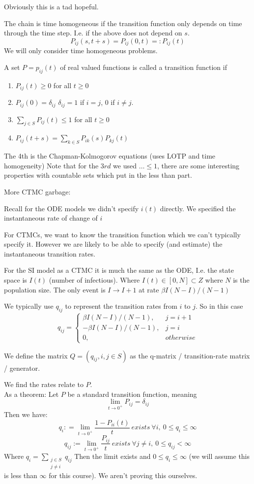 \documentclass{/home/janmebows/Documents/LatexTemplates/myassignment}
\begin{document}
Obviously this is a tad hopeful.

The chain is time homogeneous if the transition function only depends on time through the time step. I.e. if the above does not depend on $s$.
\[P_{ij}(s,t+s) = P_{ij}(0,t) =: P_{ij}(t)\]
We will only consider time homogeneous problems.

A set $P= p_{ij}(t)$ of real valued functions is called a transition function if
\begin{enumerate}
    \item $P_{ij}(t) \geq 0$ for all $t\geq 0$
    \item $P_{ij}(0) = \delta_{ij}$ $\delta_{ij} =1$ if $i=j$, $0$ if $i\neq j$.
    \item $\sum_{j\in S} P_{ij}(t) \leq 1$ for all $t\geq 0$
    \item $P_{ij}(t+s) = \sum_{k\in S} P_{ik}(s) P_{kj}(t)$
\end{enumerate}
The 4th is the Chapman-Kolmogorov equations (uses LOTP and time homogeneity)
Note that for the $3rd$ we used $\hdots \leq 1$, there are some interesting properties with countable sets which put in the less than part. 


More CTMC garbage:

Recall for the ODE models we didn't specify $i(t)$ directly. We specified the instantaneous rate of change of $i$


For CTMCs, we want to know the transition function which we can't typically specify it. However we are likely to be able to specify (and estimate) the instantaneous transition rates.

For the SI model as a CTMC it is much the same as the ODE, I.e. the state space is $I(t)$ (number of infectious). Where $I(t) \in [0,N] \subset Z$ where $N$ is the population size.
The only event is $I\to I+1$ at rate $\beta I(N-I)/(N-1)$


We typically use $q_{ij}$ to represent the transition rates from $i$ to $j$. So in this case
\[q_{ij} = \begin{cases}
\beta I(N-I)/(N-1), & j=i+1\\
-\beta I(N-I)/(N-1), & j=i\\
0, & otherwise
\end{cases}\]


We define the matrix $Q = (q_{ij}, i,j \in S)$ as the q-matrix / transition-rate matrix / generator. 

We find the rates relate to $P$. \\
As a theorem: Let $P$ be a standard transition function, meaning
\[\lim_{t\to 0^+} P_{ij} = \delta_{ij}\]
Then we have:
\[q_{i} : = \lim_{t \to 0^+} \frac{1-P_{ii}(t)}t\ exists \ \forall i,\ 0\leq q_i \leq \infty\]
\[q_{ij} := \lim_{t\to 0^+} \frac{P_{ij}}t\ exists\ \forall j\neq i,\ 0\leq q_{ij} < \infty\]
Where $q_{i} = \sum_{\substack{j\in S\\j\neq i}} q_{ij}$
Then the limit exists and $0\leq q_i \leq \infty$ (we will assume this is less than $\infty$ for this course).
We aren't proving this ourselves.
\end{document}
